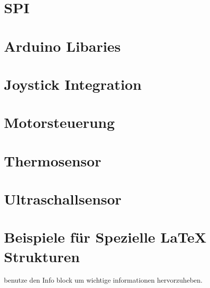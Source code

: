 \documentclass{article}
\begin{document}
\newpage    
\section{SPI}
    
\newpage
\section{Arduino Libaries} %

\newpage
\section{Joystick Integration} %

\newpage
\section{Motorsteuerung} %

\newpage
\section{Thermosensor} %

\newpage
\section{Ultraschallsensor} %


\newpage
\section{Beispiele für Spezielle LaTeX Strukturen}

\begin{info} %
	benutze den Info block um wichtige informationen hervorzuheben.
\end{info}

\end{document}
